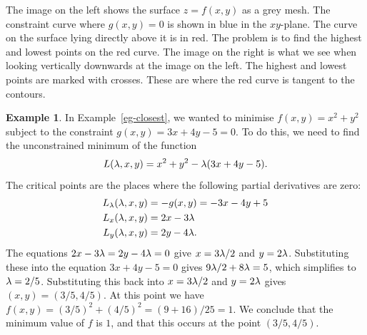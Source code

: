 \documentclass[reqno]{amsart}
\theoremstyle{definition}
\newtheorem{example}[theorem]{Example}
\begin{document}
The image on the left shows the surface $z=f(x,y)$ as a grey mesh.  
The constraint curve where $g(x,y)=0$ is shown in blue in the
$xy$-plane.  The curve on the surface lying directly above it is 
in red.  The problem is to find the highest and lowest points on
the red curve.  The image on the right is what we see when looking 
vertically downwards at the image on the left.  The highest and
lowest points are marked with crosses.  These are where the red 
curve is tangent to the contours.

\begin{example}\label{eg-closest-again}
 In Example~\ref{eg-closest}, we wanted to minimise $f(x,y)=x^2+y^2$
 subject to the constraint $g(x,y)=3x+4y-5=0$.  To do this, we need to
 find the unconstrained minimum of the function 
 \[ L(\lambda,x,y) = x^2+y^2-\lambda(3x+4y-5). \]
 The critical points are the places where the following partial
 derivatives are zero:
 \begin{align*}
  L_\lambda(\lambda,x,y) &= -g(x,y) = -3x-4y+5 \\
  L_x(\lambda,x,y) &= 2x-3\lambda \\
  L_y(\lambda,x,y) &= 2y-4\lambda.
 \end{align*}
 The equations $2x-3\lambda=2y-4\lambda=0$ give $x=3\lambda/2$ and $y=2\lambda$.
 Substituting these into the equation $3x+4y-5=0$ gives
 $9\lambda/2+8\lambda=5$, which simplifies to $\lambda=2/5$.  Substituting this
 back into $x=3\lambda/2$ and $y=2\lambda$ gives $(x,y)=(3/5,4/5)$.  At this
 point we have $f(x,y)=(3/5)^2+(4/5)^2=(9+16)/25=1$.  We conclude that
 the minimum value of $f$ is $1$, and that this occurs at the point
 $(3/5,4/5)$. 
 \begin{center}
 \end{center}
\end{example}
\end{document}

